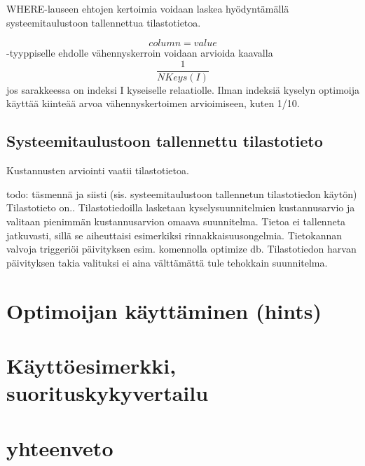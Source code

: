 \documentclass[finnish]{tktltiki2}
\theoremstyle{definition}
\theoremstyle{remark}
\begin{document}
WHERE-lauseen ehtojen kertoimia voidaan laskea hyödyntämällä systeemitaulustoon tallennettua tilastotietoa.

\begin{equation}
column = value
\end{equation}
-tyyppiselle ehdolle vähennyskerroin voidaan arvioida kaavalla
\begin{equation}
\frac{1}{NKeys(I)}
\end{equation}
jos sarakkeessa on indeksi I kyseiselle relaatiolle. Ilman indeksiä kyselyn optimoija käyttää kiinteää arvoa vähennyskertoimen arvioimiseen, kuten 1/10.

\subsection{Systeemitaulustoon tallennettu tilastotieto}
Kustannusten arviointi vaatii tilastotietoa. \cite{ramakrishnan2003database}

todo: täsmennä ja siisti
(sis. systeemitaulustoon tallennetun tilastotiedon käytön)
Tilastotieto on..
Tilastotiedoilla lasketaan kyselysuunnitelmien kustannusarvio ja valitaan pienimmän kustannusarvion omaava suunnitelma.
Tietoa ei tallenneta jatkuvasti, sillä se aiheuttaisi esimerkiksi rinnakkaisuusongelmia. Tietokannan valvoja 
triggeriöi päivityksen esim. komennolla optimize db. Tilastotiedon harvan päivityksen takia valituksi ei aina välttämättä tule 
tehokkain suunnitelma.

\section{Optimoijan käyttäminen (hints)}
\section{Käyttöesimerkki, suorituskykyvertailu}
\section{yhteenveto}



%
%
% 
%

%


\end{document}
